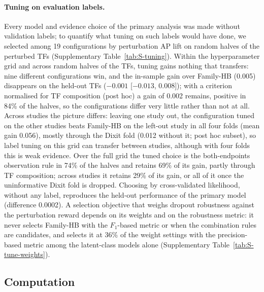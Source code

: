 \documentclass[11pt,a4paper]{article}
\begin{document}
\paragraph{Tuning on evaluation labels.}
Every model and evidence choice of the primary analysis was made without validation labels; to quantify what tuning on such labels would have done, we selected among 19 configurations by perturbation AP lift on random halves of the perturbed TFs (Supplementary Table~\ref{tab:S-tuning}).
Within the hyperparameter grid and across random halves of the TFs, tuning gains nothing that transfers: nine different configurations win, and the in-sample gain over Family-HB (0.005) disappears on the held-out TFs (\ensuremath{-0.001} [\ensuremath{-0.013}, 0.008]); with a criterion normalised for TF composition (post hoc) a gain of 0.002 remains, positive in 84\% of the halves, so the configurations differ very little rather than not at all.
Across studies the picture differs: leaving one study out, the configuration tuned on the other studies beats Family-HB on the left-out study in all four folds (mean gain 0.056), mostly through the Dixit fold (0.012 without it; post hoc subset), so label tuning on this grid can transfer between studies, although with four folds this is weak evidence.
Over the full grid the tuned choice is the both-endpoints observation rule in 74\% of the halves and retains 69\% of its gain, partly through TF composition; across studies it retains 29\% of its gain, or all of it once the uninformative Dixit fold is dropped.
Choosing by cross-validated likelihood, without any label, reproduces the held-out performance of the primary model (difference 0.0002).
A selection objective that weighs dropout robustness against the perturbation reward depends on its weights and on the robustness metric: it never selects Family-HB with the $F_1$-based metric or when the combination rules are candidates, and selects it at 36\% of the weight settings with the precision-based metric among the latent-class models alone (Supplementary Table~\ref{tab:S-tune-weights}).

\subsection{Computation}\label{sec:res-compute}
\end{document}
